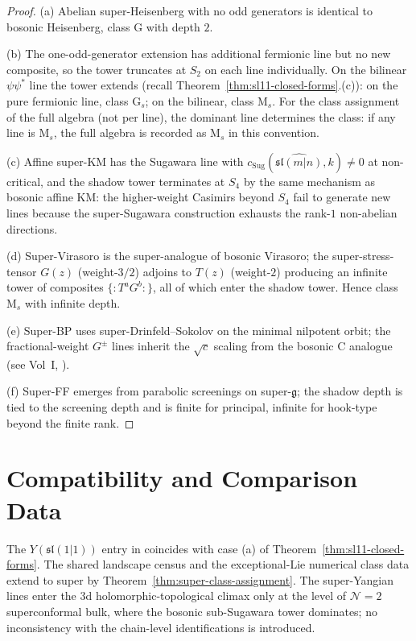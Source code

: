 \begin{proof}[Proof]
(a) Abelian super-Heisenberg with no odd generators is identical to
bosonic Heisenberg, class G with depth $2$.

(b) The one-odd-generator extension has additional fermionic line
but no new composite, so the tower truncates at $S_2$ on each line
individually. On the bilinear $\psi\psi^\ast$ line the tower extends
(recall Theorem~\ref{thm:sl11-closed-forms}.(c)): on the pure
fermionic line, class G$_s$; on the bilinear, class M$_s$. For the
class assignment of the full algebra (not per line), the dominant
line determines the class: if any line is M$_s$, the full algebra is
recorded as M$_s$ in this convention.

(c) Affine super-KM has the Sugawara line with
$c_{\mathrm{Sug}}(\widehat{\mathfrak{sl}(m|n)}, k) \ne 0$ at
non-critical, and the shadow tower terminates at $S_4$ by the same
mechanism as bosonic affine KM: the higher-weight Casimirs beyond
$S_4$ fail to generate new lines because the super-Sugawara
construction exhausts the rank-$1$ non-abelian directions.

(d) Super-Virasoro is the super-analogue of bosonic Virasoro;
the super-stress-tensor $G(z)$ (weight-$3/2$) adjoins to $T(z)$
(weight-$2$) producing an infinite tower of composites
$\{{:} T^a G^b {:}\}$, all of which enter the shadow tower. Hence
class M$_s$ with infinite depth.

(e) Super-BP uses super-Drinfeld--Sokolov on the minimal nilpotent
orbit; the fractional-weight $G^\pm$ lines inherit the $\sqrt{c}$
scaling from the bosonic C analogue (see Vol~I,
\cite{VolI}).

(f) Super-FF emerges from parabolic screenings on super-$\mathfrak{g}$;
the shadow depth is tied to the screening depth and is finite for
principal, infinite for hook-type beyond the finite rank.
\end{proof}

\section{Compatibility and Comparison Data}
\label{sec:super-riccati-compatibility}

\begin{remark}
\label{rem:super-riccati-cross-volume}
The $Y(\mathfrak{sl}(1|1))$ entry in
\cite{VolI}
coincides with case (a) of Theorem~\ref{thm:sl11-closed-forms}. The
shared landscape census and the exceptional-Lie numerical class data
extend to super by Theorem~\ref{thm:super-class-assignment}. The
super-Yangian lines enter the 3d holomorphic-topological climax only
at the level of $\mathcal{N}{=}2$ superconformal bulk, where the
bosonic sub-Sugawara tower dominates; no inconsistency with the
chain-level identifications is introduced.
\end{remark}

